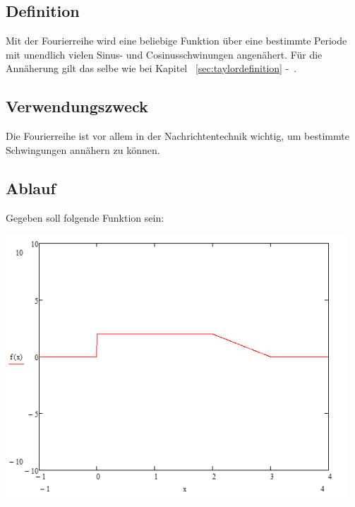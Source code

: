 \documentclass[a4paper,10pt]{article}
\begin{document}
\subsection{Definition}
Mit der Fourierreihe wird eine beliebige Funktion über eine bestimmte
Periode mit unendlich vielen Sinus- und Cosinusschwinungen
angenähert. Für die Annäherung gilt das selbe wie bei Kapitel
~\autoref{sec:taylordefinition} -~.

\subsection{Verwendungszweck}
Die Fourierreihe ist vor allem in der Nachrichtentechnik wichtig, um
bestimmte Schwingungen annähern zu können.

\subsection{Ablauf}
Gegeben soll folgende Funktion sein:\\
\begin{center}
  \includegraphics[height=10cm]{BeispielGraph}
\end{center}
\end{document}
